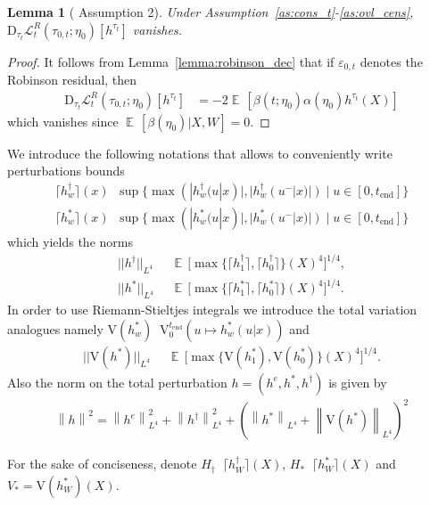 \documentclass{article}
\newtheorem{lemma}[theorem]{Lemma}
\DeclareMathOperator*{\eqdef }{\,\stackrel{\text{def}}{=}\,}
\DeclareMathOperator{\EX}{\mathbb{E}\,}
\newcommand{\norm}[1]{\left\lVert#1\right\rVert}
\newcommand{\tend}{t_{\mathrm{end}}}
\newcommand{\bD}{\mathrm{D}}
\begin{document}
\begin{lemma}[\citet{foster2023orthogonal} Assumption 2]
Under Assumption~\ref{as:cons_t}-\ref{as:ovl_cens}, 
$\bD_{\tau_t} \mathcal{L}^R_t(\tau_{0,t}; \eta_0)[h^{\tau_t}]$ vanishes.
\end{lemma}
\begin{proof}
It follows from Lemma~\ref{lemma:robinson_dec} that if $\varepsilon_{0,t}$ denotes the Robinson residual, then
\begin{align*}
\bD_{\tau_t} \mathcal{L}^R_t(\tau_{0,t}; \eta_0)[h^{\tau_t}] &= 
-2\EX [ \beta(t; \eta_0)\alpha(\eta_0) h^{\tau_t}(X)] 
\end{align*}
which vanishes since $\EX[\beta(\eta_0)|X,W]=0$.
\end{proof}

We introduce the following notations that allows to conveniently write perturbations bounds
\begin{align*}
\lceil h_w^\dagger \rceil(x) \eqdef \sup \{ \max(|h_w^\dagger(u|x)|, |h_w^\dagger(u^-|x)|) \mid u \in [0,\tend]\} \\ 
\lceil h_w^\ast \rceil(x) \eqdef \sup \{ \max(|h_w^\ast(u|x)|, |h_w^\ast(u^-|x)|) \mid u \in [0,\tend]\}
\end{align*}
which yields the norms
\begin{align*}
||h^\dagger||_{L^4} &\eqdef \EX \Big[ \max \{ \lceil h_1^\dagger \rceil, \lceil h_0^\dagger \rceil \} (X)^4 \Big]^{1/4}, \\
||h^\ast||_{L^4} &\eqdef \EX \Big[ \max \{ \lceil h_1^\ast \rceil, \lceil h_0^\ast  \rceil\} (X)^4 \Big]^{1/4}.
\end{align*}
In order to use Riemann-Stieltjes integrals we introduce the total variation analogues namely $\mathrm{V}(h_w^\ast) \eqdef \mathrm{V}_0^{\tend}(u \mapsto h_w^\ast(u|x))$ and
\begin{align*}
||\mathrm{V}(h^\ast)||_{L^4} &\eqdef \EX \Big[ \max \{ \mathrm{V}(h_1^\ast), \mathrm{V}(h_0^\ast)\}(X)^4 \Big]^{1/4}.
\end{align*}
Also the norm on the total perturbation $h = (h^e,h^\ast,h^\dagger)$ is given by
\begin{align*}
\norm{h}^2 = \norm{h^e}_{L^4}^2 + \norm{h^\dagger}_{L^4}^2 
+ \left( \norm{h^\ast}_{L^4} + \norm{\mathrm{V}(h^\ast)}_{L^4}\right)^2
\end{align*}

For the sake of conciseness, denote $H_\dagger \eqdef \lceil h_{W}^\dagger \rceil (X)$, 
$H_\ast \eqdef \lceil h_{W}^\ast \rceil (X)$ and $V_* = \mathrm{V}(h^\ast_W)(X)$.
\end{document}
